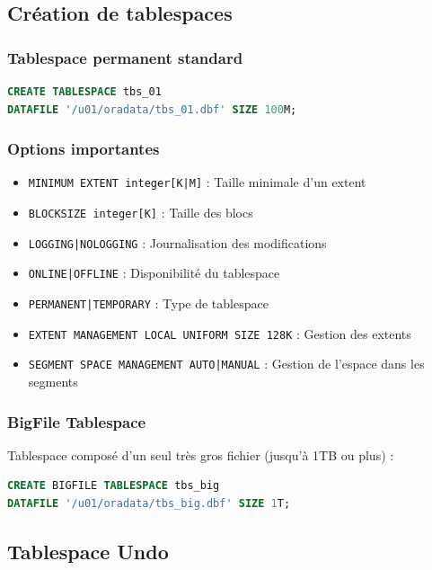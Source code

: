 \documentclass[12pt,a4paper]{article}
\begin{document}
\subsection{Création de tablespaces}

\subsubsection{Tablespace permanent standard}

\begin{lstlisting}[language=SQL]
CREATE TABLESPACE tbs_01
DATAFILE '/u01/oradata/tbs_01.dbf' SIZE 100M;
\end{lstlisting}

\subsubsection{Options importantes}

\begin{itemize}
    \item \texttt{MINIMUM EXTENT integer[K|M]} : Taille minimale d'un extent
    \item \texttt{BLOCKSIZE integer[K]} : Taille des blocs
    \item \texttt{LOGGING|NOLOGGING} : Journalisation des modifications
    \item \texttt{ONLINE|OFFLINE} : Disponibilité du tablespace
    \item \texttt{PERMANENT|TEMPORARY} : Type de tablespace
    \item \texttt{EXTENT MANAGEMENT LOCAL UNIFORM SIZE 128K} : Gestion des extents
    \item \texttt{SEGMENT SPACE MANAGEMENT AUTO|MANUAL} : Gestion de l'espace dans les segments
\end{itemize}

\subsubsection{BigFile Tablespace}

Tablespace composé d'un seul très gros fichier (jusqu'à 1TB ou plus) :
\begin{lstlisting}[language=SQL]
CREATE BIGFILE TABLESPACE tbs_big
DATAFILE '/u01/oradata/tbs_big.dbf' SIZE 1T;
\end{lstlisting}

\subsection{Tablespace Undo}
\end{document}
